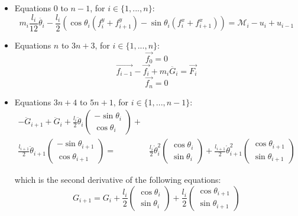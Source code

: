 \documentclass{article}
\begin{document}
\begin{itemize}
    \item Equations $0$ to $n-1$, for $i \in \{1, ..., n\}$:
    \begin{equation}
        m_i \frac{l_i}{12} \ddot{\theta_i} - \frac{l_i}{2} \left(  \cos\theta_i (f_i^y + f_{i+1}^y) - \sin\theta_i (f_i^x + f_{i+1}^x) \right)= \mathcal{M}_i - u_i + u_{i-1}
    \end{equation}
    \item Equations $n$ to $3n+3$, for $i \in \{1, ..., n\}$:
    \begin{equation}
        \vec{f_0} = 0
    \end{equation}
    \begin{equation}
        \vec{f_{i-1}} - \vec{f_i} + m_i \ddot{G_i} = \vec{F_i}
    \end{equation}
    \begin{equation}
        \vec{f_n} = 0
    \end{equation}
    
    \item Equations $3n+4$ to $5n+1$, for $i \in \{1, ..., n-1\}$:
    \begin{equation}
    \begin{split}
    -\ddot{G}_{i+1} + \ddot{G}_{i} + \frac{l_i}{2} \ddot{\theta}_{i} \begin{pmatrix}
        -\sin \theta_{i} \\
        \cos \theta_{i} 
    \end{pmatrix} + \\ \frac{l_{i+1}}{2} \ddot{\theta}_{i+1} \begin{pmatrix}
        -\sin \theta_{i+1} \\
        \cos \theta_{i+1} 
    \end{pmatrix} =  
    & \frac{l_i}{2} \dot{\theta}_{i}^2 \begin{pmatrix}
        \cos \theta_{i} \\
        \sin \theta_{i} 
    \end{pmatrix} + \frac{l_{i+1}}{2} \dot{\theta}_{i+1}^2 \begin{pmatrix}
        \cos \theta_{i+1} \\
        \sin \theta_{i+1} 
    \end{pmatrix}
    \end{split}
    \end{equation}
    
    which is the second derivative of the following equations:
    \begin{equation}
        G_{i+1} = G_i + \frac{l_i}{2} \begin{pmatrix}
        \cos \theta_{i} \\
        \sin \theta_{i} 
    \end{pmatrix} + \frac{l_i}{2} \begin{pmatrix}
        \cos \theta_{i+1} \\
        \sin \theta_{i+1} 
    \end{pmatrix}
    \end{equation}

\end{itemize}
\end{document}
